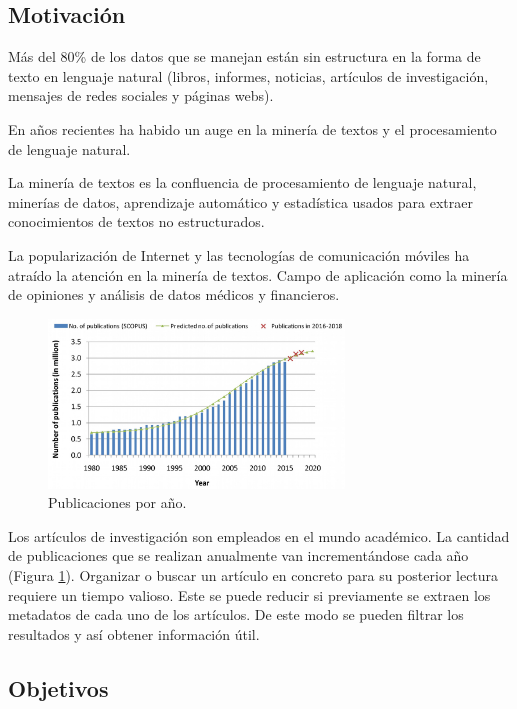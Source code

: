 \documentclass[../main.tex]{subfiles}
\begin{document}
\subsection{Motivación}

Más del 80\% de los datos que se manejan están sin estructura en la forma de texto en lenguaje natural (libros, informes, noticias, artículos de investigación, mensajes de redes sociales y páginas webs).

En años recientes ha habido un auge en la minería de textos y el procesamiento de lenguaje natural.

La minería de textos es la confluencia de procesamiento de lenguaje natural, minerías de datos, aprendizaje automático y estadística usados para extraer conocimientos de textos no estructurados.

La popularización de Internet y las tecnologías de comunicación móviles ha atraído la atención en la minería de textos. Campo de aplicación como la minería de opiniones y análisis de datos médicos y financieros.

\begin{figure}[h]
	\centering
	\includegraphics[width=0.7\textwidth]{../images/publications-per-year.jpg}
	\caption{Publicaciones por año. \cite{to2020rise}}
	\label{fig:publications-year}
\end{figure}

Los artículos de investigación son empleados en el mundo académico. La cantidad de publicaciones que se realizan anualmente van incrementándose cada año (Figura \ref{fig:publications-year}). Organizar o buscar un artículo en concreto para su posterior lectura requiere un tiempo valioso. Este se puede reducir si previamente se extraen los metadatos de cada uno de los artículos. De este modo se pueden filtrar los resultados y así obtener información útil.


\subsection{Objetivos}
\end{document}
